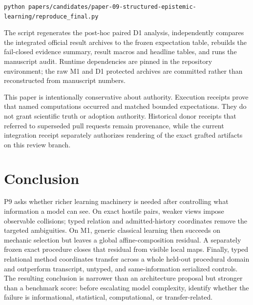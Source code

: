\documentclass[10pt]{article}
\begin{document}
\begin{verbatim}
python papers/candidates/paper-09-structured-epistemic-learning/reproduce_final.py
\end{verbatim}

The script regenerates the post-hoc paired D1 analysis, independently compares the integrated official result archives to the frozen expectation table, rebuilds the fail-closed evidence summary, result macros and headline tables, and runs the manuscript audit. Runtime dependencies are pinned in the repository environment; the raw M1 and D1 protected archives are committed rather than reconstructed from manuscript numbers.

This paper is intentionally conservative about authority. Execution receipts prove that named computations occurred and matched bounded expectations. They do not grant scientific truth or adoption authority. Historical donor receipts that referred to superseded pull requests remain provenance, while the current integration receipt separately authorizes rendering of the exact grafted artifacts on this review branch.

\section{Conclusion}

P9 asks whether richer learning machinery is needed after controlling what information a model can see. On exact hostile pairs, weaker views impose observable collisions; typed relation and admitted-history coordinates remove the targeted ambiguities. On M1, generic classical learning then succeeds on mechanic selection but leaves a global affine-composition residual. A separately frozen exact procedure closes that residual from visible local maps. Finally, typed relational method coordinates transfer across a whole held-out procedural domain and outperform transcript, untyped, and same-information serialized controls. The resulting conclusion is narrower than an architecture proposal but stronger than a benchmark score: before escalating model complexity, identify whether the failure is informational, statistical, computational, or transfer-related.



\end{document}
